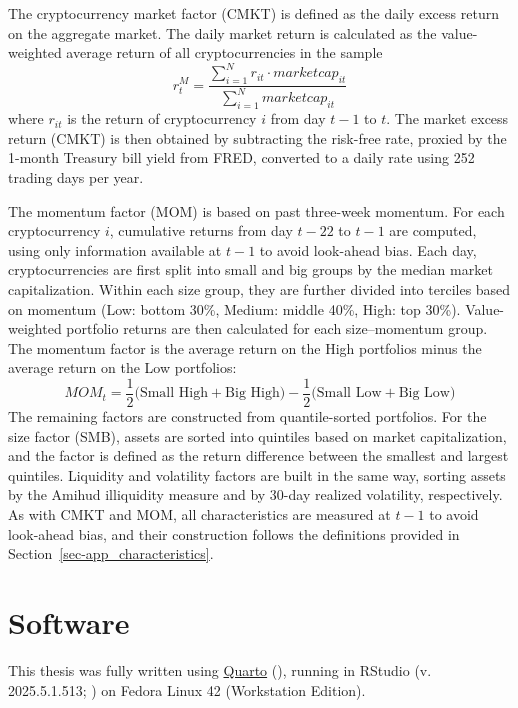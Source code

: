 \documentclass[
  12pt,
  a4paper,
  openany]{scrbook}
\begin{document}
The cryptocurrency market factor (CMKT) is defined as the daily excess
return on the aggregate market. The daily market return is calculated as
the value-weighted average return of all cryptocurrencies in the sample
\[
r_t^M = \frac{\sum_{i=1}^N r_{it} \cdot marketcap_{it}}
             {\sum_{i=1}^N marketcap_{it} }
\] where \(r_{it}\) is the return of cryptocurrency \(i\) from day
\(t-1\) to \(t\). The market excess return (CMKT) is then obtained by
subtracting the risk-free rate, proxied by the 1-month Treasury bill
yield from FRED, converted to a daily rate using 252 trading days per
year.

The momentum factor (MOM) is based on past three-week momentum. For each
cryptocurrency \(i\), cumulative returns from day \(t-22\) to \(t-1\)
are computed, using only information available at \(t-1\) to avoid
look-ahead bias. Each day, cryptocurrencies are first split into small
and big groups by the median market capitalization. Within each size
group, they are further divided into terciles based on momentum (Low:
bottom 30\%, Medium: middle 40\%, High: top 30\%). Value-weighted
portfolio returns are then calculated for each size--momentum group. The
momentum factor is the average return on the High portfolios minus the
average return on the Low portfolios: \[
MOM_t = \frac{1}{2}\big(\text{Small High} + \text{Big High}\big) 
       - \frac{1}{2}\big(\text{Small Low} + \text{Big Low}\big)
\] The remaining factors are constructed from quantile-sorted
portfolios. For the size factor (SMB), assets are sorted into quintiles
based on market capitalization, and the factor is defined as the return
difference between the smallest and largest quintiles. Liquidity and
volatility factors are built in the same way, sorting assets by the
Amihud illiquidity measure and by 30-day realized volatility,
respectively. As with CMKT and MOM, all characteristics are measured at
\(t-1\) to avoid look-ahead bias, and their construction follows the
definitions provided in Section~\ref{sec-app_characteristics}.

\section{Software}\label{sec-software}

This thesis was fully written using \href{https://quarto.org/}{Quarto}
(), running in RStudio
(v. 2025.5.1.513; ) on Fedora
Linux 42 (Workstation Edition).
\end{document}
